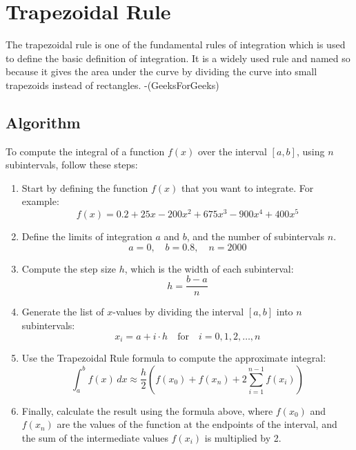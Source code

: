 \documentclass[12pt]{article}
\begin{document}
            \section*{Trapezoidal Rule}

            The trapezoidal rule is one of the fundamental rules of integration which is used to define the basic definition of integration. It is a widely used rule and named so because it gives the area under the curve by dividing the curve into small trapezoids instead of rectangles. -(GeeksForGeeks)
            \subsection*{Algorithm}

            To compute the integral of a function \( f(x) \) over the interval \([a, b]\), using \( n \) subintervals, follow these steps:

            \begin{enumerate}
                \item Start by defining the function \( f(x) \) that you want to integrate. For example:
                \[
                f(x) = 0.2 + 25x - 200x^2 + 675x^3 - 900x^4 + 400x^5
                \]

                \item Define the limits of integration \( a \) and \( b \), and the number of subintervals \( n \).
                \[
                a = 0, \quad b = 0.8, \quad n = 2000
                \]

                \item Compute the step size \( h \), which is the width of each subinterval:
                \[
                h = \frac{b - a}{n}
                \]

                \item Generate the list of \( x \)-values by dividing the interval \([a, b]\) into \( n \) subintervals:
                \[
                x_i = a + i \cdot h \quad \text{for} \quad i = 0, 1, 2, \ldots, n
                \]

                \item Use the Trapezoidal Rule formula to compute the approximate integral:
                \[
                \int_a^b f(x) \, dx \approx \frac{h}{2} \left( f(x_0) + f(x_n) + 2 \sum_{i=1}^{n-1} f(x_i) \right)
                \]

                \item Finally, calculate the result using the formula above, where \( f(x_0) \) and \( f(x_n) \) are the values of the function at the endpoints of the interval, and the sum of the intermediate values \( f(x_i) \) is multiplied by 2.
            \end{enumerate}
\end{document}
